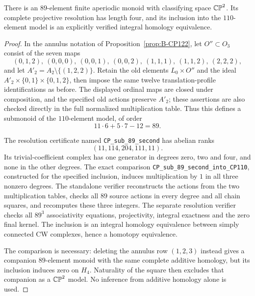 \begin{proposition}\label{prop:B-CP89}
There is an $89$-element finite aperiodic monoid with classifying
space $\mathbb {CP}^2$.  Its complete projective resolution has length four,
and its inclusion into the $110$-element model is an explicitly
verified integral homology equivalence.
\end{proposition}
\begin{proof}
In the annulus notation of Proposition~\ref{prop:B-CP122}, let
$O''\subset O_3$ consist of the seven maps
\[
 (0,1,2),\ (0,0,0),\ (0,0,1),\ (0,0,2),\
 (1,1,1),\ (1,1,2),\ (2,2,2),
\]
and let $A'_2=A_2\setminus\{(1,2,2)\}$.  Retain the old
elements $L_0\times O''$ and the ideal
$A'_2\times\{0,1\}\times\{0,1,2\}$, then impose the same
twelve translation-profile identifications as before.
The displayed ordinal maps are closed under composition, and the
specified old actions preserve $A'_2$; these assertions are also
checked directly in the full normalized multiplication table.
Thus this defines a submonoid of the $110$-element model, of order
\[
 11\cdot6+5\cdot7-12=89.
\]

The resolution certificate named \texttt{CP\_sub\_89\_second}
has abelian ranks
\[
 (11,114,204,111,11).
\]
Its trivial-coefficient complex has one generator in degrees zero,
two and four, and none in the other degrees.  The exact comparison
\texttt{CP\_sub\_89\_second\_into\_CP110}, constructed for the
specified inclusion, induces multiplication by $1$ in all three
nonzero degrees.  The standalone verifier reconstructs the actions
from the two multiplication tables, checks all $89$ source actions
in every degree and all chain squares, and recomputes these three
integers.  The separate resolution verifier checks all $89^3$
associativity equations, projectivity, integral exactness and the
zero final kernel.  The inclusion is an integral homology
equivalence between simply connected CW complexes, hence a homotopy
equivalence.

The comparison is necessary: deleting the annulus row $(1,2,3)$
instead gives a companion $89$-element monoid with the same complete
additive homology, but its inclusion induces zero on $H_4$.
Naturality of the square then excludes that companion as a
$\mathbb {CP}^2$ model.  No inference from additive homology alone is used.
\end{proof}

